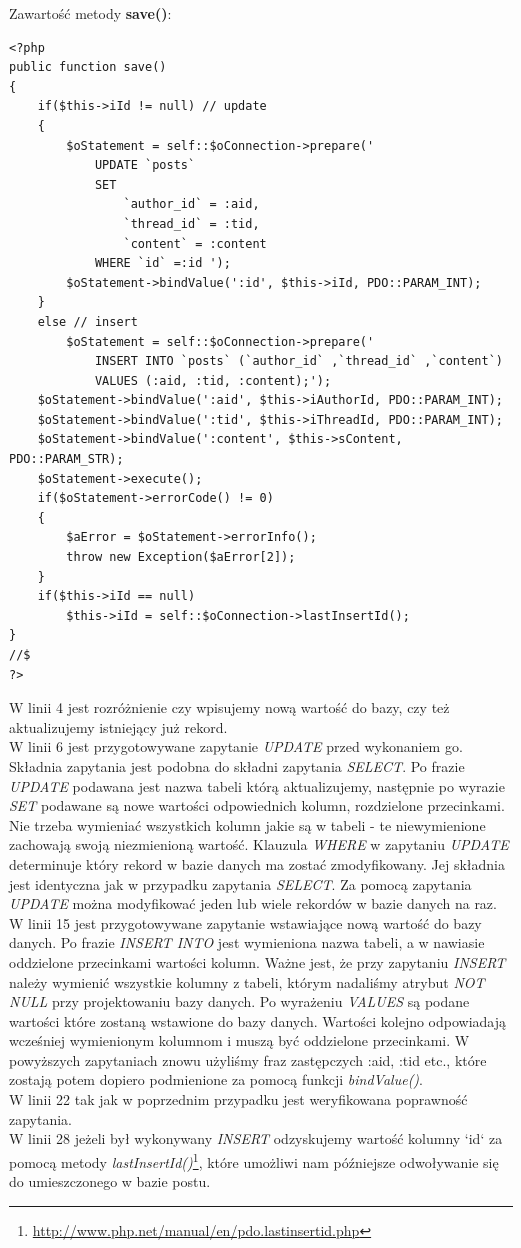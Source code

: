 \documentclass[a4paper,10pt]{article}
\begin{document}
Zawartość metody \textbf{save()}: \\
\begin{verbatim}
<?php
public function save()
{
	if($this->iId != null) // update
	{
		$oStatement = self::$oConnection->prepare('
			UPDATE `posts` 
			SET
				`author_id` = :aid,
				`thread_id` = :tid,
				`content` = :content 
			WHERE `id` =:id ');
		$oStatement->bindValue(':id', $this->iId, PDO::PARAM_INT);
	}
	else // insert
		$oStatement = self::$oConnection->prepare('
			INSERT INTO `posts` (`author_id` ,`thread_id` ,`content`) 
			VALUES (:aid, :tid, :content);');
	$oStatement->bindValue(':aid', $this->iAuthorId, PDO::PARAM_INT);
	$oStatement->bindValue(':tid', $this->iThreadId, PDO::PARAM_INT);
	$oStatement->bindValue(':content', $this->sContent, PDO::PARAM_STR);
	$oStatement->execute();
	if($oStatement->errorCode() != 0)
	{
		$aError = $oStatement->errorInfo();
		throw new Exception($aError[2]);
	}
	if($this->iId == null) 
		$this->iId = self::$oConnection->lastInsertId();
}
//$
?>
\end{verbatim}
W linii 4 jest rozróżnienie czy wpisujemy nową wartość do bazy, czy też aktualizujemy istniejący już rekord.\\
W linii 6 jest przygotowywane zapytanie \textit{UPDATE} przed wykonaniem go. Składnia zapytania jest podobna do składni zapytania \textit{SELECT}. Po frazie \textit{UPDATE} podawana jest nazwa tabeli którą aktualizujemy, następnie po wyrazie \textit{SET} podawane są nowe wartości odpowiednich kolumn, rozdzielone przecinkami. Nie trzeba wymieniać wszystkich kolumn jakie są w tabeli - te niewymienione zachowają swoją niezmienioną wartość. Klauzula \textit{WHERE} w zapytaniu \textit{UPDATE} determinuje który rekord w bazie danych ma zostać zmodyfikowany. Jej składnia jest identyczna jak w przypadku zapytania \textit{SELECT}. Za pomocą zapytania \textit{UPDATE} można modyfikować jeden lub wiele rekordów w bazie danych na raz.\\
W linii 15 jest przygotowywane zapytanie wstawiające nową wartość do bazy danych. Po frazie \textit{INSERT INTO} jest wymieniona nazwa tabeli, a w nawiasie oddzielone przecinkami wartości kolumn. Ważne jest, że przy zapytaniu \textit{INSERT} należy wymienić wszystkie kolumny z tabeli, którym nadaliśmy atrybut \textit{NOT NULL} przy projektowaniu bazy danych. Po wyrażeniu \textit{VALUES} są podane wartości które zostaną wstawione do bazy danych. Wartości kolejno odpowiadają wcześniej wymienionym kolumnom i muszą być oddzielone przecinkami. W powyższych zapytaniach znowu użyliśmy fraz zastępczych :aid, :tid etc., które zostają potem dopiero podmienione za pomocą funkcji \textit{bindValue()}. \\
W linii 22 tak jak w poprzednim przypadku jest weryfikowana poprawność zapytania. \\
W linii 28 jeżeli był wykonywany \textit{INSERT} odzyskujemy wartość kolumny `id` za pomocą metody \linebreak \textit{lastInsertId()}\footnote{\href{http://www.php.net/manual/en/pdo.lastinsertid.php}{http://www.php.net/manual/en/pdo.lastinsertid.php}}, które umożliwi nam późniejsze odwoływanie się do umieszczonego w bazie postu.\\
\end{document}
